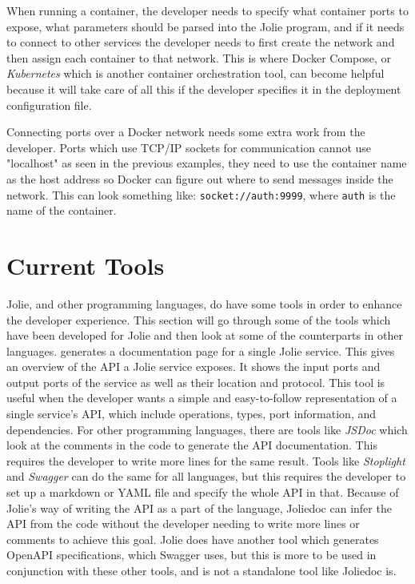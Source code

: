 When running a container, the developer needs to specify what container ports to expose, what parameters should be parsed into the Jolie program, and if it needs to connect to other services the developer needs to first create the network and then assign each container to that network.
This is where Docker Compose, or \textit{Kubernetes} which is another container orchestration tool, can become helpful because it will take care of all this if the developer specifies it in the deployment configuration file.

Connecting ports over a Docker network needs some extra work from the developer. Ports which use TCP/IP sockets for communication cannot use "localhost" as seen in the previous examples, they need to use the container name as the host address so Docker can figure out where to send messages inside the network.
This can look something like: \texttt{socket://auth:9999}, where \texttt{auth} is the name of the container.

\section{Current Tools}
Jolie, and other programming languages, do have some tools in order to enhance the developer experience. This section will go through some of the tools
which have been developed for Jolie and then look at some of the counterparts in other languages.
%
 generates a documentation page for a single Jolie service. This gives an overview of the API a Jolie service exposes. It shows the input ports and output ports of the service as well as their location and protocol.
This tool is useful when the developer wants a simple and easy-to-follow representation of a single service's API, which include operations, types, port information, and dependencies.
For other programming languages, there are tools like \textit{JSDoc} which look at the comments in the code to generate the API documentation. This requires the developer to write more lines for the same result.
Tools like \textit{Stoplight} and \textit{Swagger} can do the same for all languages, but this requires the developer to set up a markdown or YAML file and specify the whole API in that.
Because of Jolie's way of writing the API as a part of the language, Joliedoc can infer the API from the code without the developer needing to write more lines or comments to achieve this goal.
Jolie does have another tool which generates OpenAPI specifications, which Swagger uses, but this is more to be used in conjunction with these other tools, and is not a standalone tool like Joliedoc is.


